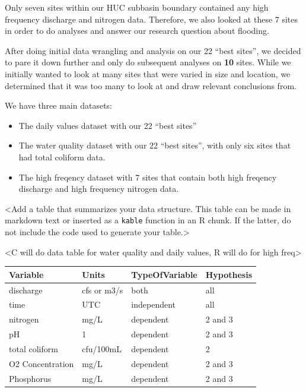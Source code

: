 \documentclass[12pt,]{article}
\begin{document}
Only seven sites within our HUC subbasin boundary contained any high
frequency discharge and nitrogen data. Therefore, we also looked at
these 7 sites in order to do analyses and answer our research question
about flooding.

After doing initial data wrangling and analysis on our 22 ``best
sites'', we decided to pare it down further and only do subsequent
analyses on \textbf{10} sites. While we initially wanted to look at many
sites that were varied in size and location, we determined that it was
too many to look at and draw relevant conclusions from.

We have three main datasets:

\begin{itemize}
\item
  The daily values dataset with our 22 ``best sites''
\item
  The water quality dataset with our 22 ``best sites'', with only six
  sites that had total coliform data.
\item
  The high freqency dataset with 7 sites that contain both high freqency
  discharge and high frequency nitrogen data.
\end{itemize}

\textless{}Add a table that summarizes your data structure. This table
can be made in markdown text or inserted as a \texttt{kable} function in
an R chunk. If the latter, do not include the code used to generate your
table.\textgreater{}

\textless{}C will do data table for water quality and daily values, R
will do for high freq\textgreater{}

\begin{tabular}{l|l|l|l}
\hline
Variable & Units & TypeOfVariable & Hypothesis\\
\hline
discharge & cfs or m3/s & both & all\\
\hline
time & UTC & independent & all\\
\hline
nitrogen & mg/L & dependent & 2 and 3\\
\hline
pH & 1 & dependent & 2 and 3\\
\hline
total coliform & cfu/100mL & dependent & 2\\
\hline
O2 Concentration & mg/L & dependent & 2 and 3\\
\hline
Phosphorus & mg/L & dependent & 2 and 3\\
\hline
\end{tabular}

\newpage
\end{document}
